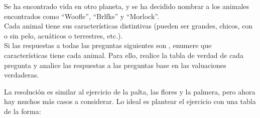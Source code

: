 \documentclass[12pt, addpoints]{../../common/epyl_exam_template}
\begin{document}
\begin{questions}
  
  \jump
  \question
    Se ha encontrado vida en otro planeta, y se ha decidido nombrar a los animales
    encontrados como ``Woofle'', ``Brlfks'' y ``Morlock''.\\
    Cada animal tiene sus características distintivas (pueden ser grandes, chicos,
    con o sin pelo, acuáticos o terrestres, etc.).\\
    Si las respuestas a todas las preguntas siguientes son \fulltrue, enumere que
    características tiene cada animal. Para ello, realice la tabla de verdad de
    cada pregunta y analice las respuestas a las preguntas base en las valuaciones
    verdaderas.
    ~\\
    \begin{solution}
      La resolución es similar al ejercicio de la palta, las flores y la palmera,
      pero ahora hay muchos más casos a considerar. Lo ideal es plantear el ejercicio
      con una tabla de la forma:
      

\end{solution}
\end{questions}
\end{document}
